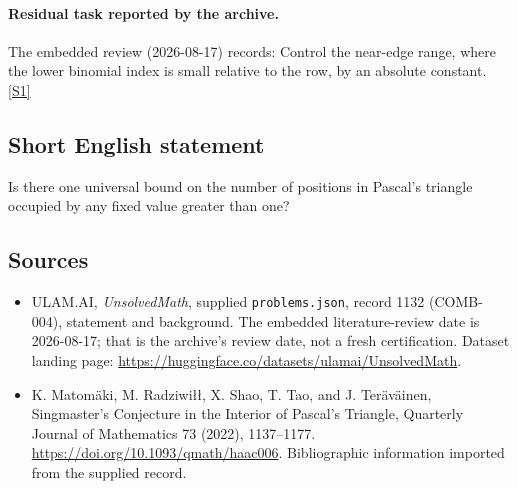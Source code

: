 \documentclass[11pt,a4paper]{article}
\newcommand{\sref}[2]{\hyperlink{source:#1:#2}{[S#2]}}
\begin{document}
\paragraph{Residual task reported by the archive.}

The embedded review (2026-08-17) records: Control the near-edge range, where the lower binomial index is small relative to the row, by an absolute constant. \sref{1132}{1}

\subsection{Short English statement}

Is there one universal bound on the number of positions in Pascal’s triangle occupied by any fixed value greater than one?

\subsection{Sources}

{\small

\begin{itemize}

\item[\hypertarget{source:1132:1}{S1}] ULAM.AI, \emph{UnsolvedMath}, supplied \texttt{problems.json}, record 1132 (COMB-004), statement and background. The embedded literature-review date is 2026-08-17; that is the archive’s review date, not a fresh certification. Dataset landing page: \url{https://huggingface.co/datasets/ulamai/UnsolvedMath}.

\item[\hypertarget{source:1132:2}{S2}] K. Matomäki, M. Radziwiłł, X. Shao, T. Tao, and J. Teräväinen, Singmaster's Conjecture in the Interior of Pascal's Triangle, Quarterly Journal of Mathematics 73 (2022), 1137–1177. \url{https://doi.org/10.1093/qmath/haac006}. Bibliographic information imported from the supplied record.

\end{itemize}

}

\label{end:1132}
\end{document}
